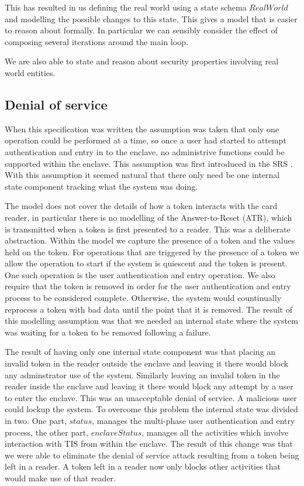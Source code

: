 This has resulted in us defining the real world using a state schema
$RealWorld$ and modelling the possible changes to this state. This
gives a model that is easier to reason about formally. In particular
we can sensibly consider the effect of composing several iterations
around the main loop.

We are also able to state and reason about security properties
involving real world entities.

\subsection{Denial of service}
When this specification was written the assumption was taken that
only one operation could be performed at a time, so once a user had
started to attempt authentication and entry in to the enclave, no
administrive functions could be supported within the enclave. This
assumption was first introduced in the SRS \cite{SRS}. With this
assumption it seemed natural that there only need be one internal
state component tracking what the system was doing. 

The model does not cover the details of how a token interacts with the
card reader, in particular there is no modelling of the
Answer-to-Reset (ATR), which is
transmitted when a token is first presented to a reader. This was a
deliberate abstraction. Within the model we capture the presence of a
token and the values held on the token. For operations that are
triggered by the presence of a token we allow the operation to start
if the system is quiescent and the token is present. One such
operation is the user authentication and entry operation. We
also require that the token is removed in order for the user
authentication and entry process to be considered complete. 
Otherwise, the system would countinually reprocess 
a token with bad data until the point that it is removed. 
The result of this modelling assumption was that we needed an
internal state where the system was waiting for a token to be removed
following a failure. 

The result of having only one internal state component was that
placing an invalid token in the reader outside the enclave and leaving
it there would block any adminstrator use of the system. Similarly
leaving an invalid token in the reader inside the enclave and leaving
it there would block any attempt by a user to enter the enclave. This
was an unacceptable denial of service. A malicious user could lockup the
system. To overcome this problem the internal state was divided in
two. One part, $status$, manages the multi-phase user authentication and
entry process, the other part, $enclaveStatus$, manages all the
activities which involve interaction with TIS from within the enclave.
The result of this change was that we were able to eliminate the
denial of service attack resulting from a token being left in a
reader. A token left in a reader now only blocks other activities that
would make use of that reader.

